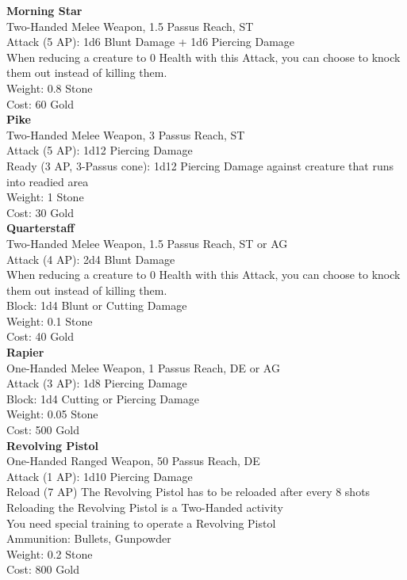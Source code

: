 \textbf{Morning Star}\\
Two-Handed Melee Weapon, 1.5 Passus Reach, ST\\
Attack (5 AP): 1d6 Blunt Damage + 1d6 Piercing Damage\\
When reducing a creature to 0 Health with this Attack, you can choose to knock them out instead of killing them.\\
Weight: 0.8 Stone\\
Cost: 60 Gold\\


\textbf{Pike}\\
Two-Handed Melee Weapon, 3 Passus Reach, ST\\
Attack (5 AP): 1d12 Piercing Damage\\
Ready (3 AP, 3-Passus cone): 1d12 Piercing Damage against creature that runs into readied area\\
Weight: 1 Stone\\
Cost: 30 Gold\\


\textbf{Quarterstaff}\\
Two-Handed Melee Weapon, 1.5 Passus Reach, ST or AG\\
Attack (4 AP): 2d4 Blunt Damage\\
When reducing a creature to 0 Health with this Attack, you can choose to knock them out instead of killing them.\\
Block: 1d4 Blunt or Cutting Damage\\
Weight: 0.1 Stone\\
Cost: 40 Gold\\


\textbf{Rapier}\\
One-Handed Melee Weapon, 1 Passus Reach, DE or AG\\
Attack (3 AP): 1d8 Piercing Damage\\
Block: 1d4 Cutting or Piercing Damage\\
Weight: 0.05 Stone\\
Cost: 500 Gold\\


\textbf{Revolving Pistol}\\
One-Handed Ranged Weapon, 50 Passus Reach, DE\\
Attack (1 AP): 1d10 Piercing Damage\\
Reload (7 AP) The Revolving Pistol has to be reloaded after every 8 shots\\
Reloading the Revolving Pistol is a Two-Handed activity\\
You need special training to operate a Revolving Pistol\\
Ammunition: Bullets, Gunpowder\\
Weight: 0.2 Stone\\
Cost: 800 Gold\\


